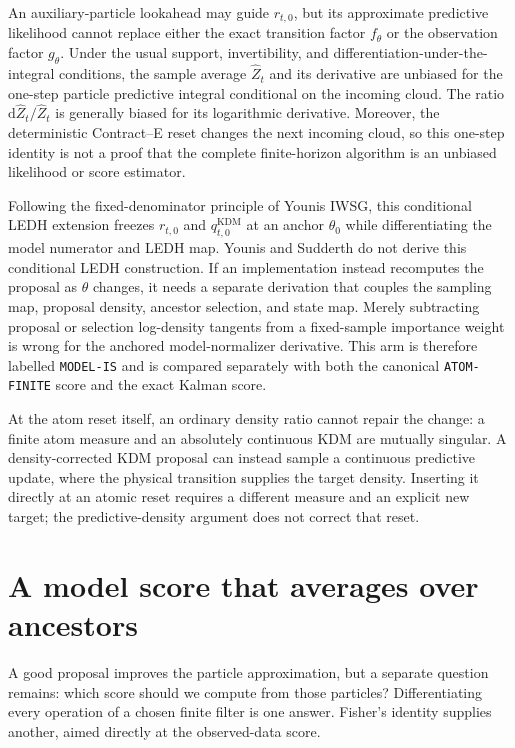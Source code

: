 \documentclass[11pt]{article}
\newcommand{\dd}{\mathrm{d}}
\newcommand{\KDM}{\ensuremath{\mathrm{KDM}}}
\begin{document}
An auxiliary-particle lookahead may guide $r_{t,0}$, but its approximate
predictive likelihood cannot replace either the exact transition factor
$f_\theta$ or the observation factor $g_\theta$.  Under the usual support,
invertibility, and differentiation-under-the-integral conditions, the sample
average $\widehat Z_t$ and its derivative are unbiased for the one-step
particle predictive integral conditional on the incoming cloud.  The ratio
$\dd\widehat Z_t/\widehat Z_t$ is generally biased for its logarithmic
derivative.  Moreover, the deterministic Contract--E reset changes the next
incoming cloud, so this one-step identity is not a proof that the complete
finite-horizon algorithm is an unbiased likelihood or score estimator.

Following the fixed-denominator principle of Younis IWSG, this conditional
LEDH extension freezes $r_{t,0}$ and $q^{\KDM}_{t,0}$ at an anchor $\theta_0$ while
differentiating the model numerator and LEDH map.  Younis and Sudderth do not
derive this conditional LEDH construction.  If an implementation instead
recomputes the proposal as $\theta$ changes, it needs a separate derivation
that couples the sampling map, proposal density, ancestor selection, and state
map.  Merely subtracting proposal or selection log-density tangents from a
fixed-sample importance weight is wrong for the anchored model-normalizer
derivative.  This arm is therefore labelled
\texttt{MODEL-IS} and is compared separately with both the canonical
\texttt{ATOM-FINITE} score and the exact Kalman score.

At the atom reset itself, an ordinary density ratio cannot repair the change:
a finite atom measure and an absolutely continuous KDM are mutually singular.
A density-corrected KDM proposal can instead sample a continuous predictive
update, where the physical transition supplies the target density. Inserting
it directly at an atomic reset requires a different measure and an explicit
new target; the predictive-density argument does not correct that reset.

\section{A model score that averages over ancestors}
\label{sec:fisher}

A good proposal improves the particle approximation, but a separate question
remains: which score should we compute from those particles? Differentiating
every operation of a chosen finite filter is one answer. Fisher's identity
supplies another, aimed directly at the observed-data score.
\end{document}
